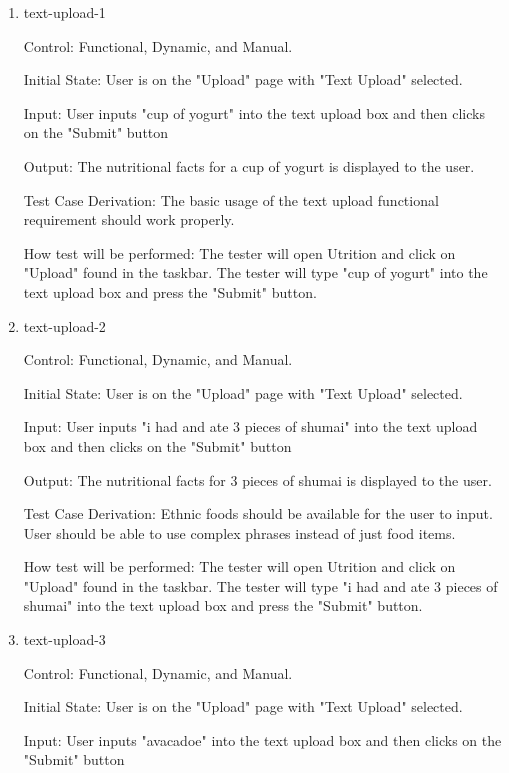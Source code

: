 \documentclass[12pt, titlepage]{article}
\begin{document}
	\begin{enumerate}
	\item{text-upload-1\\}
	
	Control: Functional, Dynamic, and Manual.
	
	Initial State: User is on the "Upload" page with "Text Upload" selected.
	
	Input: User inputs "cup of yogurt" into the text upload box and then clicks on the "Submit" button
	
	Output: The nutritional facts for a cup of yogurt is displayed to the user.
	
	Test Case Derivation: The basic usage of the text upload functional requirement should work properly.
	
	How test will be performed: The tester will open Utrition and click on "Upload" found in the taskbar. The tester will type "cup of yogurt" into the text upload box and press the "Submit" button.
	
	\item{text-upload-2\\}
	
	Control: Functional, Dynamic, and Manual.
	
	Initial State: User is on the "Upload" page with "Text Upload" selected.
	
	Input: User inputs "i had and ate 3 pieces of shumai" into the text upload box and then clicks on the "Submit" button
	
	Output: The nutritional facts for 3 pieces of shumai is displayed to the user.
	
	Test Case Derivation: Ethnic foods should be available for the user to input. User should be able to use complex phrases instead of just food items.
	
	How test will be performed: The tester will open Utrition and click on "Upload" found in the taskbar. The tester will type "i had and ate 3 pieces of shumai" into the text upload box and press the "Submit" button.
	
	\item{text-upload-3\\}
	
	Control: Functional, Dynamic, and Manual.
	
	Initial State: User is on the "Upload" page with "Text Upload" selected.
	
	Input: User inputs "avacadoe" into the text upload box and then clicks on the "Submit" button
	

\end{enumerate}
\end{document}
